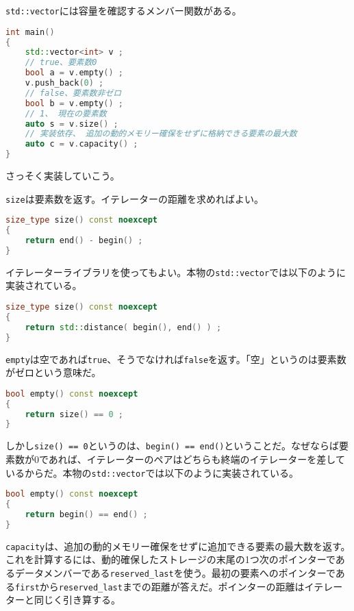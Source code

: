 
\texttt{std::vector}には容量を確認するメンバー関数がある。

\begin{lstlisting}[language={C++}]
int main()
{
    std::vector<int> v ;
    // true、要素数0
    bool a = v.empty() ;
    v.push_back(0) ;
    // false、要素数非ゼロ
    bool b = v.empty() ;
    // 1、 現在の要素数
    auto s = v.size() ;
    // 実装依存、 追加の動的メモリー確保をせずに格納できる要素の最大数
    auto c = v.capacity() ;
}
\end{lstlisting}

さっそく実装していこう。

\texttt{size}は要素数を返す。イテレーターの距離を求めればよい。

\begin{lstlisting}[language={C++}]
size_type size() const noexcept
{
    return end() - begin() ;
}
\end{lstlisting}

イテレーターライブラリを使ってもよい。本物の\texttt{std::vector}では以下のように実装されている。

\begin{lstlisting}[language={C++}]
size_type size() const noexcept
{
    return std::distance( begin(), end() ) ;
}
\end{lstlisting}

\texttt{empty}は空であれば\texttt{true}、そうでなければ\texttt{false}を返す。「空」というのは要素数がゼロという意味だ。

\begin{lstlisting}[language={C++}]
bool empty() const noexcept
{
    return size() == 0 ;
}
\end{lstlisting}

しかし\texttt{size() == 0}というのは、\texttt{begin() == end()}ということだ。なぜならば要素数が0であれば、イテレーターのペアはどちらも終端のイテレーターを差しているからだ。本物の\texttt{std::vector}では以下のように実装されている。

\begin{lstlisting}[language={C++}]
bool empty() const noexcept
{
    return begin() == end() ;
}
\end{lstlisting}

\texttt{capacity}は、追加の動的メモリー確保をせずに追加できる要素の最大数を返す。これを計算するには、動的確保したストレージの末尾の1つ次のポインターであるデータメンバーである\texttt{reserved\_last}を使う。最初の要素へのポインターである\texttt{first}から\texttt{reserved\_last}までの距離が答えだ。ポインターの距離はイテレーターと同じく引き算する。

